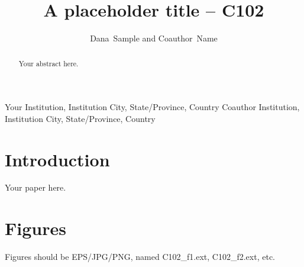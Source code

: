 \documentclass[11pt,twoside]{article}
\begin{document}
\title{A placeholder title -- C102}

\author{Dana~Sample and Coauthor~Name}
Your Institution, Institution City, State/Province, Country
Coauthor Institution, Institution City, State/Province, Country



\begin{abstract}
Your abstract here.
\end{abstract}

\section{Introduction}

Your paper here.

\section{Figures}

Figures should be EPS/JPG/PNG, named C102\_f1.ext, C102\_f2.ext, etc.

% 
\end{document}
